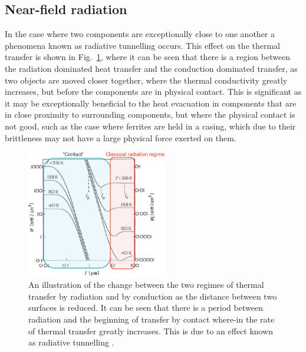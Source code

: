 \subsection{Near-field radiation}

In the case where two components are exceptionally close to one another a phenomena known as radiative tunnelling occurs. This effect on the thermal transfer is shown in Fig.~\ref{fig:irTun}, where it can be seen that there is a region between the radiation dominated heat transfer and the conduction dominated transfer, as two objects are moved closer together, where the thermal conductivity greatly increases, but before the components are in physical contact. This is significant as it may be exceptionally beneficial to the heat evacuation in components that are in close proximity to surrounding components, but where the physical contact is not good, such as the case where ferrites are held in a casing, which due to their brittleness may not have a large physical force exerted on them.

\begin{figure}
\begin{center}
\includegraphics[width=0.55\textwidth]{appendices/figures/irTunnelling.png}
\end{center}
\caption{An illustration of the change between the two regimes of thermal transfer by radiation and by conduction as the distance between two surfaces is reduced. It can be seen that there is a period between radiation and the beginning of transfer by contact where-in the rate of thermal transfer greatly increases. This is due to an effect known as radiative tunnelling \cite{Hargreaves:IRTunnel}.}
\label{fig:irTun}
\end{figure}
